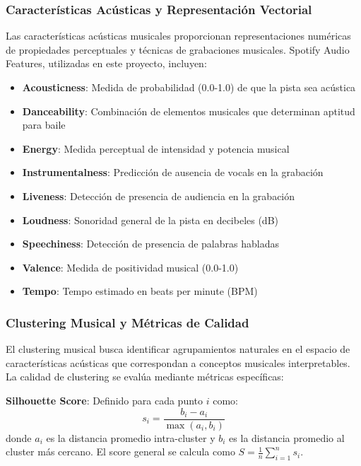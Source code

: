 \documentclass[12pt,a4paper]{article}
\begin{document}
\subsubsection{Características Acústicas y Representación Vectorial}

Las características acústicas musicales proporcionan representaciones numéricas de propiedades perceptuales y técnicas de grabaciones musicales. Spotify Audio Features, utilizadas en este proyecto, incluyen:

\begin{itemize}
    \item \textbf{Acousticness}: Medida de probabilidad (0.0-1.0) de que la pista sea acústica
    \item \textbf{Danceability}: Combinación de elementos musicales que determinan aptitud para baile
    \item \textbf{Energy}: Medida perceptual de intensidad y potencia musical
    \item \textbf{Instrumentalness}: Predicción de ausencia de vocals en la grabación
    \item \textbf{Liveness}: Detección de presencia de audiencia en la grabación
    \item \textbf{Loudness}: Sonoridad general de la pista en decibeles (dB)
    \item \textbf{Speechiness}: Detección de presencia de palabras habladas
    \item \textbf{Valence}: Medida de positividad musical (0.0-1.0)
    \item \textbf{Tempo}: Tempo estimado en beats per minute (BPM)
\end{itemize}

\subsubsection{Clustering Musical y Métricas de Calidad}

El clustering musical busca identificar agrupamientos naturales en el espacio de características acústicas que correspondan a conceptos musicales interpretables. La calidad de clustering se evalúa mediante métricas específicas:

\textbf{Silhouette Score}: Definido para cada punto $i$ como:
\[s_i = \frac{b_i - a_i}{\max(a_i, b_i)}\]
donde $a_i$ es la distancia promedio intra-cluster y $b_i$ es la distancia promedio al cluster más cercano. El score general se calcula como $S = \frac{1}{n}\sum_{i=1}^{n} s_i$.
\end{document}
